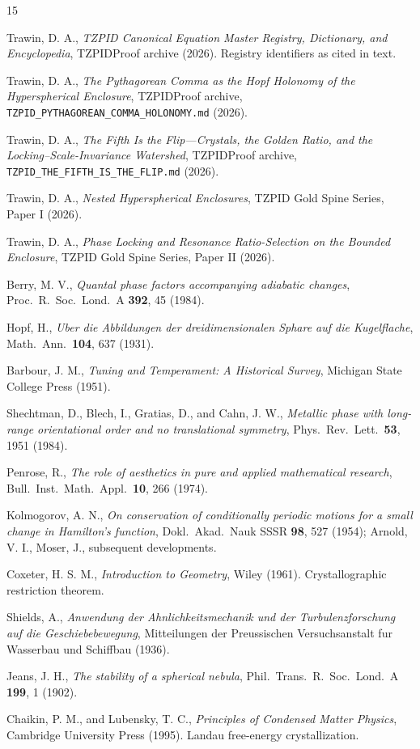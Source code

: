 \documentclass[11pt]{article}
\theoremstyle{remark}
\begin{document}
\begin{thebibliography}{15}

 Trawin, D. A., \emph{TZPID Canonical Equation Master Registry, Dictionary, and Encyclopedia}, TZPIDProof archive (2026). Registry identifiers as cited in text.

 Trawin, D. A., \emph{The Pythagorean Comma as the Hopf Holonomy of the Hyperspherical Enclosure}, TZPIDProof archive, \texttt{TZPID\_PYTHAGOREAN\_COMMA\_HOLONOMY.md} (2026).

 Trawin, D. A., \emph{The Fifth Is the Flip---Crystals, the Golden Ratio, and the Locking--Scale-Invariance Watershed}, TZPIDProof archive, \texttt{TZPID\_THE\_FIFTH\_IS\_THE\_FLIP.md} (2026).

 Trawin, D. A., \emph{Nested Hyperspherical Enclosures}, TZPID Gold Spine Series, Paper I (2026).

 Trawin, D. A., \emph{Phase Locking and Resonance Ratio-Selection on the Bounded Enclosure}, TZPID Gold Spine Series, Paper II (2026).

 Berry, M. V., \emph{Quantal phase factors accompanying adiabatic changes}, Proc.\ R.\ Soc.\ Lond.\ A \textbf{392}, 45 (1984).

 Hopf, H., \emph{Uber die Abbildungen der dreidimensionalen Sphare auf die Kugelflache}, Math.\ Ann.\ \textbf{104}, 637 (1931).

 Barbour, J. M., \emph{Tuning and Temperament: A Historical Survey}, Michigan State College Press (1951).

 Shechtman, D., Blech, I., Gratias, D., and Cahn, J. W., \emph{Metallic phase with long-range orientational order and no translational symmetry}, Phys.\ Rev.\ Lett.\ \textbf{53}, 1951 (1984).

 Penrose, R., \emph{The role of aesthetics in pure and applied mathematical research}, Bull.\ Inst.\ Math.\ Appl.\ \textbf{10}, 266 (1974).

 Kolmogorov, A. N., \emph{On conservation of conditionally periodic motions for a small change in Hamilton's function}, Dokl.\ Akad.\ Nauk SSSR \textbf{98}, 527 (1954); Arnold, V. I., Moser, J., subsequent developments.

 Coxeter, H. S. M., \emph{Introduction to Geometry}, Wiley (1961). Crystallographic restriction theorem.

 Shields, A., \emph{Anwendung der Ahnlichkeitsmechanik und der Turbulenzforschung auf die Geschiebebewegung}, Mitteilungen der Preussischen Versuchsanstalt fur Wasserbau und Schiffbau (1936).

 Jeans, J. H., \emph{The stability of a spherical nebula}, Phil.\ Trans.\ R.\ Soc.\ Lond.\ A \textbf{199}, 1 (1902).

 Chaikin, P. M., and Lubensky, T. C., \emph{Principles of Condensed Matter Physics}, Cambridge University Press (1995). Landau free-energy crystallization.

\end{thebibliography}
\end{document}
